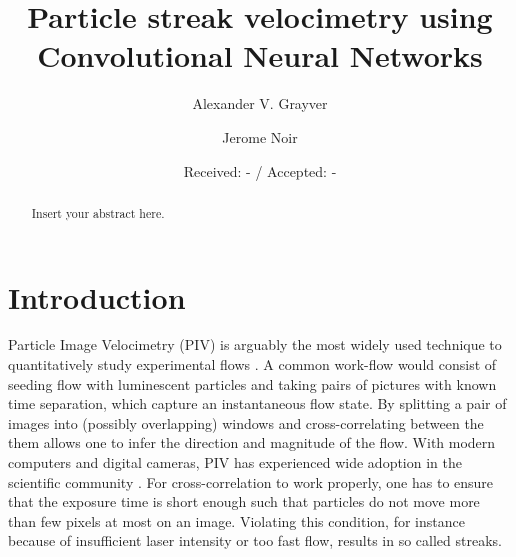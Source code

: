 \documentclass{svjour3}                     %
\begin{document}
\title{Particle streak velocimetry using Convolutional Neural Networks}

\author{Alexander V. Grayver         \and
        Jerome Noir
}


\date{Received: - / Accepted: -}


\maketitle

\begin{abstract}
Insert your abstract here. 
\end{abstract}

\section{Introduction}
\label{intro}

Particle Image Velocimetry (PIV) is arguably the most widely used technique to quantitatively study experimental flows \cite{raffel2018particle}. A common work-flow would consist of seeding flow with luminescent particles and taking pairs of pictures with known time separation, which capture an instantaneous flow state. By splitting a pair of images into (possibly overlapping) windows and cross-correlating between the them allows one to infer the direction and magnitude of the flow. With modern computers and digital cameras, PIV has experienced wide adoption in the scientific community \cite{JN}. For cross-correlation to work properly, one has to ensure that the exposure time is short enough such that particles do not move more than few pixels at most on an image. Violating this condition, for instance because of insufficient laser intensity or too fast flow, results in so called streaks. 
\end{document}
